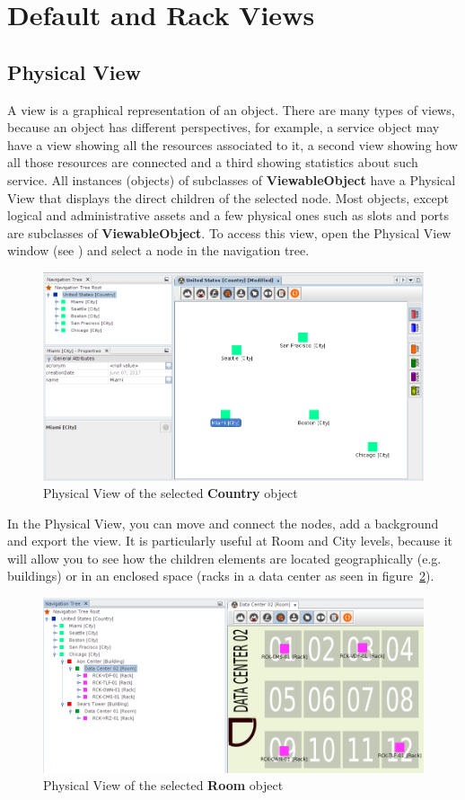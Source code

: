 \documentclass[a4paper]{article}
\begin{document}
	\newpage
	\section{Default and Rack Views}
	\subsection{Physical View} \label{sec:default_view}
		A view is a graphical representation of an object. There are many types of views, because an object has different perspectives, for example, a service object may have a view showing all the resources associated to it, a second view showing how all those resources are connected and a third showing statistics about such service. All instances (objects) of subclasses of \textbf{ViewableObject} have a Physical View that displays the direct children of the selected node. Most objects, except logical and administrative assets and a few physical ones such as slots and ports are subclasses of \textbf{ViewableObject}. To access this view, open the Physical View window (see ) and select a node in the navigation tree.
		\begin{figure}[h!]
			\centering
			\includegraphics[width=0.9\linewidth]{img/default_view.png}
			\caption{Physical View of the selected \textbf{Country} object}
			\label{fig:default_view}
		\end{figure}
		
		In the Physical View, you can move and connect the nodes, add a background and export the view. It is particularly useful at Room and City levels, because it will allow you to see how the children elements are located geographically (e.g. buildings) or in an enclosed space (racks in a data center as seen in figure~\ref{fig:room_plan}).	
		\begin{figure}[h!]
			\centering
			\includegraphics[width=0.8\linewidth]{img/room_plan.png}
			\caption{Physical View of the selected \textbf{Room} object}
			\label{fig:room_plan}
		\end{figure}
		
\end{document}

